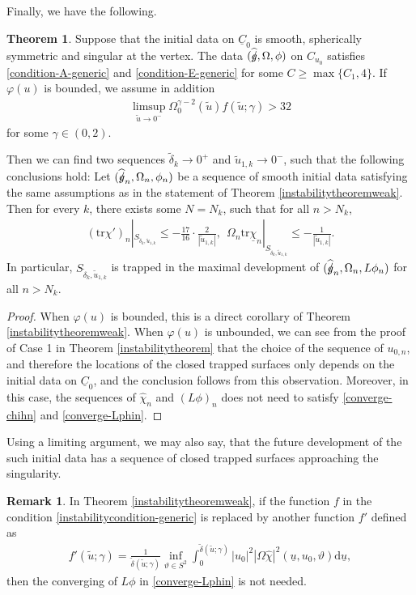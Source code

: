 \documentclass[11pt,reqno]{amsart}
\theoremstyle{definition}
\newtheorem{theorem}{Theorem}[section]
\newtheorem{remark}{Remark}[section]
\numberwithin{equation}{section}
\newcommand{\D}{\mathrm{d}}
\newcommand{\tr}{\mathrm{tr}}
\def\chib{\underline{\chi}}
\def\chih{\widehat{\chi}}
\def\tr{\mathrm{tr}}
\def\ub{\underline{u}}
\def\Cb{\underline{C}}
\newcommand{\tdelta}{\widetilde{\delta}}
\newcommand{\tu}{\widetilde{u}}
\def\gs{\mbox{$g \mkern -9mu /$}}
\begin{document}
Finally, we have the following.
\begin{theorem}\label{instabilitycorollaryweak}
Suppose that the initial data on $\Cb_0$ is smooth, spherically symmetric and singular at the vertex. The data $(\widehat{\gs},\Omega,\phi)$ on $C_{u_0}$ satisfies \eqref{condition-A-generic} and \eqref{condition-E-generic} for some $C\ge\max\{C_1,4\}$. If $\varphi(u)$ is bounded, we assume in addition
\begin{align}\label{instabilityconditionlimsup-generic}
\limsup_{\tu\to0^-}\Omega_0^{\gamma-2}(\tu)f(\tu;\gamma)>32
\end{align}
 for some $\gamma\in(0,2)$.
 
Then we can find two sequences $\tdelta_k\to0^+$ and $\tu_{1,k}\to0^-$, such that the following conclusions hold: Let $(\widehat{\gs}_n,\Omega_n,\phi_n)$ be a sequence of smooth initial data satisfying the same assumptions as in the statement of Theorem \ref{instabilitytheoremweak}. 
Then for every $k$, there exists some $N=N_k$, such that for all $n>N_k$, 
\begin{align*}
(\tr\chi')_n|_{S_{\tdelta_k,\tu_{1,k}}}\le-\frac{17}{16}\cdot\frac{2}{|\tu_{1,k}|}, \ \ \Omega_n\tr\chib_n|_{S_{\tdelta_k,\tu_{1,k}}}\le-\frac{1}{|\tu_{1,k}|}.
\end{align*}
In particular, $S_{\tdelta_k,\tu_{1,k}}$ is trapped in the maximal development of $(\widehat{\gs}_n,\Omega_n,L\phi_n)$ for all $n>N_k$.
\end{theorem}
\begin{proof}
When $\varphi(u)$ is bounded, this is a direct corollary of Theorem \ref{instabilitytheoremweak}. When $\varphi(u)$ is unbounded, we can see from the proof of Case 1 in Theorem \ref{instabilitytheorem} that the choice of the sequence of $u_{0,n}$, and therefore the locations of the closed trapped surfaces only depends on the initial data on $\Cb_0$, and the conclusion follows from this observation. Moreover, in this case, the sequences of $\chih_n$ and $(L\phi)_n$ does not need to satisfy \eqref{converge-chihn} and \eqref{converge-Lphin}.

\end{proof}
Using a limiting argument, we may also say, that the future development of the such initial data has a sequence of closed trapped surfaces approaching the singularity.
\begin{remark}
In Theorem \ref{instabilitytheoremweak}, if the function $f$ in the condition \eqref{instabilitycondition-generic} is replaced by another function $f'$ defined as
\begin{align}\label{def-f'}
f'(\widetilde{u};\gamma)=\frac{1}{\tdelta(\tu;\gamma)}\inf_{\vartheta\in S^2}\int_0^{\tdelta(\tu;\gamma)}|u_0|^2|\Omega\chih|^2(\ub,u_0,\vartheta)\D\ub,
\end{align}
then the converging of $L\phi$ in \eqref{converge-Lphin} is not needed. \end{remark}
\end{document}
